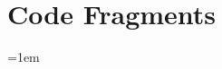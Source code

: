 \documentclass[
11pt, %
oneside, %
english, %
singlespacing, %
liststotoc, %
toctotoc, %
parskip, %
headsepline, %
]{MastersDoctoralThesis} %
\newcommand{\appendixinput}[1]{}
\begin{document}

\appendix

\chapter{Code Fragments}
\appendixinput{code.tex}


\emergencystretch=1em
\printbibliography[heading=bibintoc]

\end{document}
